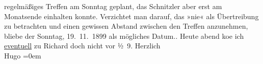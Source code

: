 \begin{ledgroupsized}[t]{13cm}
{{{                  regelmäßiges Treffen am Sonntag geplant, das Schnitzler aber erst am Monatsende einhalten konnte. Verzichtet man
                  darauf, das »nie« als Übertreibung zu betrachten und einen gewissen Abstand
                  zwischen den Treffen anzunehmen, bliebe der Sonntag, 19. 11. 1899 als
                  mögliches Datum.}}}\label{K_L00998_1h}.\pend
           \pstart
           Heute abend ko{\geminationm}e ich \uline{eventuell} zu Richard doch nicht vor
                  ½ 9.\pend
           \pstart
           Herzlich{\\[\baselineskip]}\spacefill\mbox{Hugo}\pend
           \leftskip=0em{}
         
         \endnumbering{}\end{ledgroupsized}  \newcommand{\dateiname}{L00998}\newcommand{\titel}{Hugo von Hofmannsthal an Arthur Schnitzler, [19. 11. 1899?]}\newcommand{\editorInnen}{Martin Anton Müller und Gerd-Hermann Susen}
      